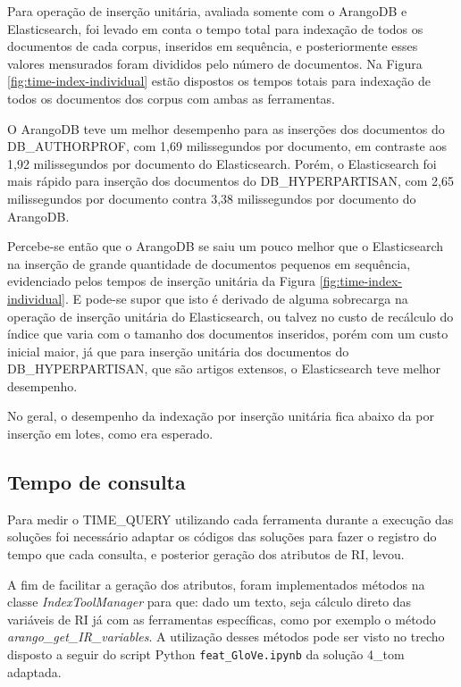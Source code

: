 			Para operação de inserção unitária, avaliada somente com o ArangoDB e Elasticsearch, foi levado em conta o tempo total para indexação de todos os documentos de cada corpus, inseridos em sequência, e posteriormente esses valores mensurados foram divididos pelo número de documentos.
			Na Figura \ref{fig:time-index-individual} estão dispostos os tempos totais para indexação de todos os documentos dos corpus com ambas as ferramentas. 

			

			O ArangoDB teve um melhor desempenho para as inserções dos documentos do DB\_AUTHORPROF, com 1,69 milissegundos por documento, em contraste aos 1,92 milissegundos por documento do Elasticsearch.
			Porém, o Elasticsearch foi mais rápido para inserção dos documentos do DB\_HYPERPARTISAN, com 2,65 milissegundos por documento contra 3,38 milissegundos por documento do ArangoDB.		

			Percebe-se então que o ArangoDB se saiu um pouco melhor que o Elasticsearch na inserção de grande quantidade de documentos pequenos em sequência, evidenciado pelos tempos de inserção unitária da Figura \ref{fig:time-index-individual}.
			E pode-se supor que isto é derivado de alguma sobrecarga na operação de inserção unitária do Elasticsearch, ou talvez no custo de recálculo do índice que varia com o tamanho dos documentos inseridos, porém com um custo inicial maior, já que para inserção unitária dos documentos do DB\_HYPERPARTISAN, que são artigos extensos, o Elasticsearch teve melhor desempenho.
				
			No geral, o desempenho da indexação por inserção unitária fica abaixo da por inserção em lotes, como era esperado.

		\subsection{Tempo de consulta}
			Para medir o TIME\_QUERY utilizando cada ferramenta durante a execução das soluções foi necessário adaptar os códigos das soluções para fazer o registro do tempo que cada consulta, e posterior geração dos atributos de RI, levou.

			A fim de facilitar a geração dos atributos, foram implementados métodos na classe \textit{IndexToolManager} para que: dado um texto, seja cálculo direto das variáveis de RI já com as ferramentas específicas, como por exemplo o método \textit{arango\_get\_IR\_variables}.
			A utilização desses métodos pode ser visto no trecho disposto a seguir do script Python \texttt{feat\_GloVe.ipynb} da solução 4\_tom adaptada.

